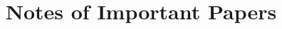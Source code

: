 \documentclass[preprint, onecolumn, numbers]{sigplanconf}
\begin{document}
\title{Notes of Important Papers}

\authorinfo{}


\maketitle

\begin{abstract}

\end{abstract}







{


%
}
\end{document}
